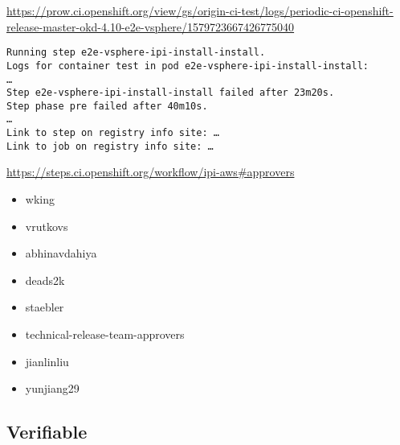\begin{frame}[fragile]
    \autotitle
    \footnotesize
    \url{https://prow.ci.openshift.org/view/gs/origin-ci-test/logs/periodic-ci-openshift-release-master-okd-4.10-e2e-vsphere/1579723667426775040}
    \vspace{\baselineskip}
    \begin{verbatim}
Running step e2e-vsphere-ipi-install-install.
Logs for container test in pod e2e-vsphere-ipi-install-install:
…
Step e2e-vsphere-ipi-install-install failed after 23m20s.
Step phase pre failed after 40m10s.
…
Link to step on registry info site: …
Link to job on registry info site: …
    \end{verbatim}
\end{frame}

\begin{frame}
    \autotitle
    \footnotesize
    \url{https://steps.ci.openshift.org/workflow/ipi-aws\#approvers}
    \normalsize
    \begin{itemize}
        \item wking
        \item vrutkovs
        \item abhinavdahiya
        \item deads2k
        \item staebler
        \item technical-release-team-approvers
        \item jianlinliu
        \item yunjiang29
    \end{itemize}
\end{frame}

\subsection{Verifiable}

